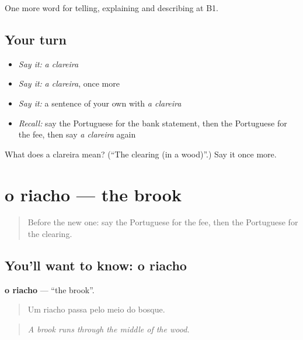 \begin{grammarlens}[title={What you've built}]
One more word for telling, explaining and describing at B1.
\end{grammarlens}

\subsection*{Your turn}
\begin{itemize}
\raggedright
  \item \emph{Say it:} \emph{a clareira}
  \item \emph{Say it:} \emph{a clareira}, once more
  \item \emph{Say it:} a sentence of your own with \emph{a clareira}
  \item \emph{Recall:} say the Portuguese for the bank statement, then the Portuguese for the fee, then say \emph{a clareira} again
\end{itemize}

\begin{tcolorbox}[breakable,colback=teal!4,colframe=teal!35!black,title={Before you move on}]
What does a clareira mean? (\textquotedblleft{}The clearing (in a wood)\textquotedblright{}.) Say it once more.
\end{tcolorbox}
\section[o riacho]{o riacho — the brook}

\label{lesson:PT-C456-riacho}



\begin{quote}
Before the new one: say the Portuguese for the fee, then the Portuguese for the clearing.
\end{quote}

\subsection*{You'll want to know: o riacho}
\textbf{o riacho} — \textquotedblleft{}the brook\textquotedblright{}.

\begin{quote}
Um riacho passa pelo meio do bosque.
\end{quote}

\begin{quote}
\emph{A brook runs through the middle of the wood.}
\end{quote}

